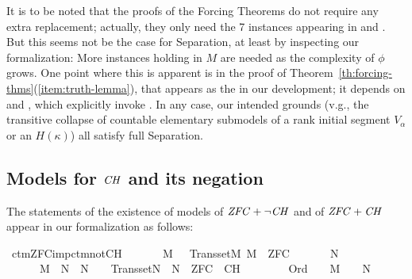 It is to be noted that the proofs of the Forcing Theorems do not
require any extra replacement; actually, they only need the 7
instances appearing in  and
.  But this seems not be
the case for Separation, at least by inspecting our formalization:
More instances holding in $M$ are needed 
as the complexity of $\phi$ grows. One point where this is apparent is
in the proof of Theorem~\ref{th:forcing-thms}(\ref{item:truth-lemma}),
that appears as the  in our development; it
depends on  and
, which explicitly invoke
. In any case, our intended grounds
(v.g., the transitive collapse of countable elementary submodels of a
rank initial segment $V_\alpha$ or an $H(\kappa)$) all satisfy full
Separation.


\subsection{Models for $\mathit{CH}$ and its negation}
\label{sec:models-ch-negation}

The statements of the existence of models of $\mathit{ZFC} + \neg\mathit{CH}$ and of
$\mathit{ZFC} + \mathit{CH}$  appear in our formalization as follows:

\begin{isabelle}
\isamarkupfalse%
\ ctm{\isacharunderscore}{\kern0pt}ZFC{\isacharunderscore}{\kern0pt}imp{\isacharunderscore}{\kern0pt}ctm{\isacharunderscore}{\kern0pt}not{\isacharunderscore}{\kern0pt}CH{\isacharcolon}{\kern0pt}\isanewline
\ \ \isanewline
\ \ \ \ {\isachardoublequoteopen}M\ {\isasymapprox}\ {\isasymomega}{\isachardoublequoteclose}\ {\isachardoublequoteopen}Transset{\isacharparenleft}{\kern0pt}M{\isacharparenright}{\kern0pt}{\isachardoublequoteclose}\ {\isachardoublequoteopen}M\ {\isasymTurnstile}\ ZFC{\isachardoublequoteclose}\isanewline
\ \ \isanewline
\ \ \ \ {\isachardoublequoteopen}{\isasymexists}N{\isachardot}{\kern0pt}\isanewline
\ \ \ \ \ \ M\ {\isasymsubseteq}\ N\ {\isasymand}\ N\ {\isasymapprox}\ {\isasymomega}\ {\isasymand}\ Transset{\isacharparenleft}{\kern0pt}N{\isacharparenright}{\kern0pt}\ {\isasymand}\ N\ {\isasymTurnstile}\ ZFC\ {\isasymunion}\ {\isacharbraceleft}{\kern0pt}{\isasymcdot}{\isasymnot}{\isasymcdot}CH{\isasymcdot}{\isasymcdot}{\isacharbraceright}{\kern0pt}\ {\isasymand}\isanewline
\ \ \ \ \ \ {\isacharparenleft}{\kern0pt}{\isasymforall}{\isasymalpha}{\isachardot}{\kern0pt}\ Ord{\isacharparenleft}{\kern0pt}{\isasymalpha}{\isacharparenright}{\kern0pt}\ {\isasymlongrightarrow}\ {\isacharparenleft}{\kern0pt}{\isasymalpha}\ {\isasymin}\ M\ {\isasymlongleftrightarrow}\ {\isasymalpha}\ {\isasymin}\ N{\isacharparenright}{\kern0pt}{\isacharparenright}{\kern0pt}{\isachardoublequoteclose}
\end{isabelle}

